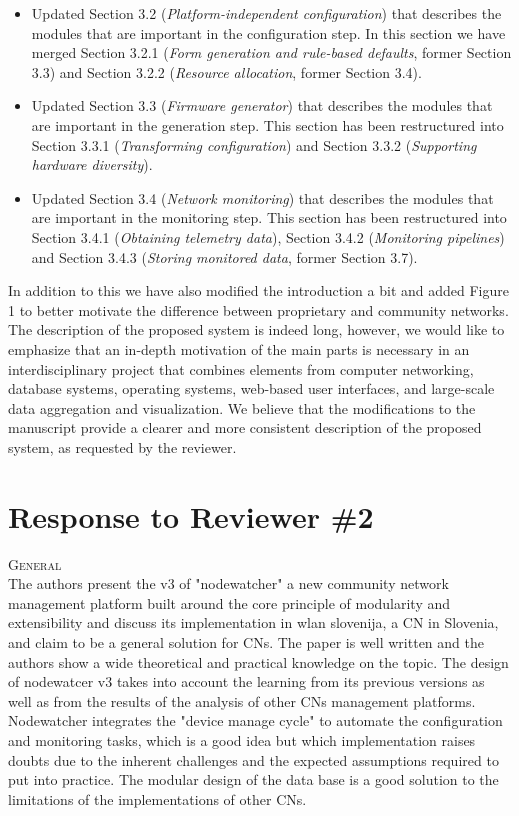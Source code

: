 \documentclass[12pt,twoside,a4paper]{report}
\begin{document}
\begin{itemize}
\item Updated Section 3.2 (\textit{Platform-independent configuration}) that describes the modules that are important in the configuration step.
In this section we have merged Section 3.2.1 (\textit{Form generation and rule-based defaults}, former Section 3.3) and Section 3.2.2 (\textit{Resource allocation}, former Section 3.4).
\item Updated Section 3.3 (\textit{Firmware generator}) that describes the modules that are important in the generation step.
This section has been restructured into Section 3.3.1 (\textit{Transforming configuration}) and Section 3.3.2 (\textit{Supporting hardware diversity}).
\item Updated Section 3.4 (\textit{Network monitoring}) that describes the modules that are important in the monitoring step.
This section has been restructured into Section 3.4.1 (\textit{Obtaining telemetry data}), Section 3.4.2 (\textit{Monitoring pipelines}) and Section 3.4.3 (\textit{Storing monitored data}, former Section 3.7).
\end{itemize}

In addition to this we have also modified the introduction a bit and added Figure 1 to better motivate the difference between proprietary and community networks. The description of the proposed system is indeed long, however, we would like to emphasize that an in-depth motivation of the main parts is necessary in an interdisciplinary project that combines elements from computer networking, database systems, operating systems, web-based user interfaces, and large-scale data aggregation and visualization. We believe that the modifications to the manuscript provide a clearer and more consistent description of the proposed system, as requested by the reviewer. 

\newpage

\section*{Response to Reviewer \#2}

\vspace{0.5cm}\noindent\textsc{General}\\
The authors present the v3 of "nodewatcher" a new community network management platform built around the core principle of modularity and extensibility and discuss its implementation in wlan slovenija, a CN in Slovenia, and claim to be a general solution for CNs. The paper is well written and the authors show a wide theoretical and practical knowledge on the topic. The design of nodewatcer v3 takes into account the learning from its previous versions as well as from the results of the analysis of other CNs management platforms. Nodewatcher integrates the "device manage cycle" to automate the configuration and monitoring tasks, which is a good idea but which implementation raises doubts due to the inherent challenges and the expected assumptions required to put into practice. The modular design of the data base is a good solution to the limitations of the implementations of other CNs.
\end{document}
